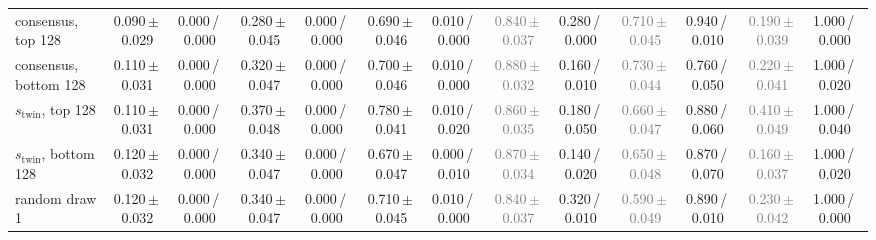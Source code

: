 \begin{tabular}{@{}lcccccccccccc@{}}
consensus, top 128 & 0.090\,{\scriptsize$\pm$\,0.029} & {\scriptsize 0.000\,/\,0.000} & 0.280\,{\scriptsize$\pm$\,0.045} & {\scriptsize 0.000\,/\,0.000} & 0.690\,{\scriptsize$\pm$\,0.046} & {\scriptsize 0.010\,/\,0.000} & \textcolor{gray}{0.840\,{\scriptsize$\pm$\,0.037}} & {\scriptsize 0.280\,/\,0.000} & \textcolor{gray}{0.710\,{\scriptsize$\pm$\,0.045}} & {\scriptsize 0.940\,/\,0.010} & \textcolor{gray}{0.190\,{\scriptsize$\pm$\,0.039}} & {\scriptsize 1.000\,/\,0.000} \\
consensus, bottom 128 & 0.110\,{\scriptsize$\pm$\,0.031} & {\scriptsize 0.000\,/\,0.000} & 0.320\,{\scriptsize$\pm$\,0.047} & {\scriptsize 0.000\,/\,0.000} & 0.700\,{\scriptsize$\pm$\,0.046} & {\scriptsize 0.010\,/\,0.000} & \textcolor{gray}{0.880\,{\scriptsize$\pm$\,0.032}} & {\scriptsize 0.160\,/\,0.010} & \textcolor{gray}{0.730\,{\scriptsize$\pm$\,0.044}} & {\scriptsize 0.760\,/\,0.050} & \textcolor{gray}{0.220\,{\scriptsize$\pm$\,0.041}} & {\scriptsize 1.000\,/\,0.020} \\
$s_{\text{twin}}$, top 128 & 0.110\,{\scriptsize$\pm$\,0.031} & {\scriptsize 0.000\,/\,0.000} & 0.370\,{\scriptsize$\pm$\,0.048} & {\scriptsize 0.000\,/\,0.000} & 0.780\,{\scriptsize$\pm$\,0.041} & {\scriptsize 0.010\,/\,0.020} & \textcolor{gray}{0.860\,{\scriptsize$\pm$\,0.035}} & {\scriptsize 0.180\,/\,0.050} & \textcolor{gray}{0.660\,{\scriptsize$\pm$\,0.047}} & {\scriptsize 0.880\,/\,0.060} & \textcolor{gray}{0.410\,{\scriptsize$\pm$\,0.049}} & {\scriptsize 1.000\,/\,0.040} \\
$s_{\text{twin}}$, bottom 128 & 0.120\,{\scriptsize$\pm$\,0.032} & {\scriptsize 0.000\,/\,0.000} & 0.340\,{\scriptsize$\pm$\,0.047} & {\scriptsize 0.000\,/\,0.000} & 0.670\,{\scriptsize$\pm$\,0.047} & {\scriptsize 0.000\,/\,0.010} & \textcolor{gray}{0.870\,{\scriptsize$\pm$\,0.034}} & {\scriptsize 0.140\,/\,0.020} & \textcolor{gray}{0.650\,{\scriptsize$\pm$\,0.048}} & {\scriptsize 0.870\,/\,0.070} & \textcolor{gray}{0.160\,{\scriptsize$\pm$\,0.037}} & {\scriptsize 1.000\,/\,0.020} \\
\midrule
random draw 1 & 0.120\,{\scriptsize$\pm$\,0.032} & {\scriptsize 0.000\,/\,0.000} & 0.340\,{\scriptsize$\pm$\,0.047} & {\scriptsize 0.000\,/\,0.000} & 0.710\,{\scriptsize$\pm$\,0.045} & {\scriptsize 0.010\,/\,0.000} & \textcolor{gray}{0.840\,{\scriptsize$\pm$\,0.037}} & {\scriptsize 0.320\,/\,0.010} & \textcolor{gray}{0.590\,{\scriptsize$\pm$\,0.049}} & {\scriptsize 0.890\,/\,0.010} & \textcolor{gray}{0.230\,{\scriptsize$\pm$\,0.042}} & {\scriptsize 1.000\,/\,0.000} \\

\end{tabular}
